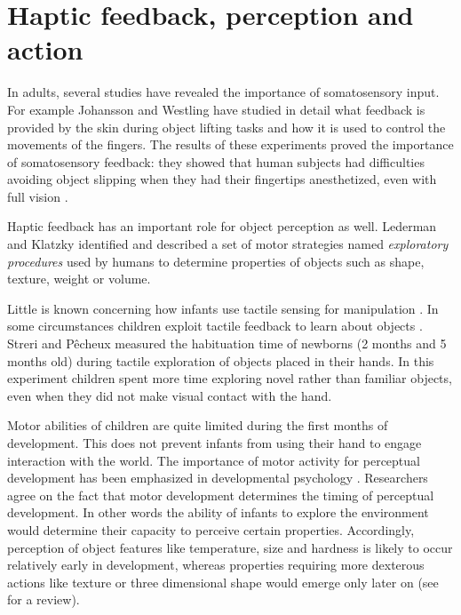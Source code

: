 \section{Haptic feedback, perception and action}
\label{sec:background}

In adults, several studies have revealed the importance of
somatosensory input. For example Johansson and Westling
\cite{Johansson90Tactile} have studied in detail what feedback is
provided by the skin during object lifting tasks and how it is
used to control the movements of the fingers. The results of these
experiments proved the importance of somatosensory feedback: they
showed that human subjects had difficulties avoiding object
slipping when they had their fingertips anesthetized, even with
full vision \cite{johansson91how}.

Haptic feedback has an important role for object perception as
well. Lederman and Klatzky \cite{lederman87hand} identified and
described a set of motor strategies named \emph{exploratory
procedures} used by humans to determine properties of objects such
as shape, texture, weight or volume.

Little is known concerning how infants use tactile sensing for
manipulation \cite{streri93Seeing}.
In some circumstances children exploit tactile feedback to learn
about objects \cite{streri86Habituation}. Streri and P\^{e}cheux
measured the habituation time of newborns (2 months and 5 months
old) during tactile exploration of objects placed in their hands.
In this experiment children spent more time exploring novel rather
than familiar objects, even when they did not make visual contact
with the hand. %

Motor abilities of children are quite limited during the first
months of development. This does not prevent infants from using
their hand to engage interaction with the world. The importance of
motor activity for perceptual development has been emphasized in
developmental psychology \cite{hofsten04motor,gibson88explore}.
Researchers agree on the fact that motor development determines
the timing of perceptual development. In other words the ability
of infants to explore the environment would determine their
capacity to perceive certain properties. Accordingly, perception
of object features like temperature, size and hardness is likely
to occur relatively early in development, whereas properties
requiring more dexterous actions like texture or three dimensional
shape would emerge only later on (see \cite{bushnell93motor} for a
review).
